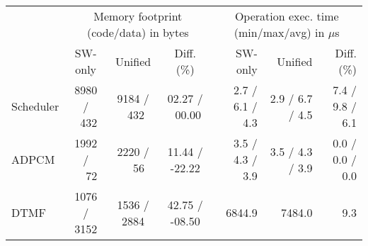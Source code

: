 \begin{tabular}{|l|ccc|rrr|}
\cline{2-7}
\multicolumn{1}{c}{}  &   \multicolumn{3}{|c|}{Memory footprint (code/data) in bytes}    & \multicolumn{3}{|c|}{Operation exec. time (min/max/avg) in $\mu$s} \\
\multicolumn{1}{c|}{} &   SW-only    &   Unified     &       Diff. (\%)                  & SW-only          &  Unified  &     Diff. (\%) \\
\cline{1-1}
Scheduler             &  8980 / ~432 &   9184 / ~432 &  02.27 / ~00.00                   & 2.7 / 6.1 / 4.3 & 2.9 / 6.7 / 4.5 & 7.4 / 9.8 / 6.1\\
ADPCM                 &  1992 / ~~72 &   2220 / ~~56 &  11.44 / -22.22                   & 3.5 / 4.3 / 3.9 & 3.5 / 4.3 / 3.9 & 0.0 / 0.0 / 0.0\\
DTMF                  &  1076 / 3152 &   1536 / 2884 &  42.75 / -08.50                   & 6844.9          & 7484.0          & 9.3\\
\hline

\end{tabular}


